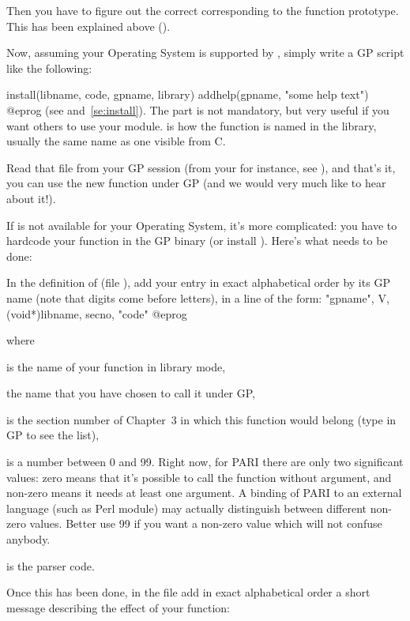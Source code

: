 Then you have to figure out the correct  corresponding to
the function prototype. This has been explained above
().

Now, assuming your Operating System is supported by , simply
write a GP script like the following:

\bprog
install(libname, code, gpname, library)
addhelp(gpname, "some help text")
@eprog
\noindent(see  and~\ref{se:install}). The 
part is not mandatory, but very useful if you want others to use your
module.   is how the function is named in the library,
usually the same name as one visible from C.

Read that file from your GP session (from your  for
instance, see ), and that's it, you can use the new
function  under GP (and we would very much like to hear about
it!).


If  is not available for your Operating System, it's more
complicated: you have to hardcode your function in the GP binary (or
install ). Here's what needs to be done: 

In the definition of  (file ),
add your entry in exact alphabetical order by its GP name (note that digits
come before letters), in a line of the form:
\bprog
{ "gpname", V, (void*)libname, secno, "code" }
@eprog

\noindent where

 is the name of your function in library mode,

 the name that you have chosen to call it under GP,

 is the section number of Chapter~3 in which this function would
belong (type  in GP to see the list),

 is a number between 0 and 99. Right now, for PARI there are only two
significant values: zero means that it's possible to call the function
without argument, and non-zero means it needs at least one argument.
A binding of PARI to an external language (such as 
Perl module) may actually distinguish between different non-zero values.
Better use 99 if you want a non-zero value which will not confuse anybody.

 is the parser code.

Once this has been done, in the file  add in
exact alphabetical order a short message describing the effect of your
function:

